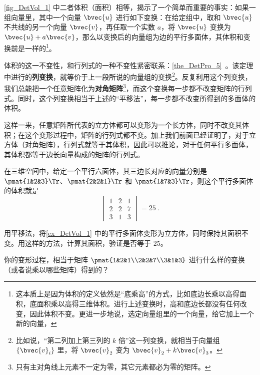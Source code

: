 \autoref{fig_DetVol_1} 中二者体积（面积）相等，揭示了一个简单而重要的事实：如果一组向量里，其中一个向量 $\bvec{u}$ 进行如下变换：在给定组中，取和 $\bvec{u}$ 不共线的另一个向量 $\bvec{v}$，再任取一个实数 $a$，将 $\bvec{u}$ 变换为 $\bvec{u}+a\bvec{v}$，那么以变换后的向量组为边的平行多面体，其体积和变换前是一样的\footnote{这本质上是因为体积的定义依然是“底乘高”的方式，比如底边长乘以高得面积，底面积乘以高得三维体积。进行上述变换时，高和底边长都没有任何改变，因此体积不变。更进一步地说，选定向量组里的一个向量，给它加上一个新的向量，}。

体积的这一不变性，和行列式的一种不变性紧密联系：\autoref{the_DetPro_5}~。该定理中进行的\textbf{列变换}，就等价于上一段所说的向量组的变换\footnote{比如说，“第二列加上第三列的 $k$ 倍”这一列变换，就相当于向量组 $\{\bvec{v}_i\}$ 里，将 $\bvec{v}_2$ 变为 $\bvec{v}_2+k\bvec{v}_3$。}。反复利用这个列变换，我们总能把一个任意矩阵化为\textbf{对角矩阵}\footnote{只有主对角线上元素不一定为零，其它元素都必为零的矩阵。}，而这个变换每一步都不改变矩阵的行列式。同时，这个列变换相当于上述的“平移法”，每一步都不改变所得到的多面体的体积。

这样一来，任意矩阵所代表的立方体都可以变形为一个长方体，同时不改变其体积；在这个变形过程中，矩阵的行列式都不变。加上我们前面已经证明了，对于立方体（对角矩阵），行列式就等于其体积，因此可以推论，对于任何平行多面体，其体积都等于边长向量构成的矩阵的行列式。

\begin{example}{}\label{ex_DetVol_1}
在三维空间中，给定一个平行六面体，其三边长对应的向量分别是 $\pmat{1&2&3}\Tr$、$\pmat{2&2&1}\Tr$ 和 $\pmat{1&7&3}\Tr$，则这个平行多面体的体积就是
\begin{equation}
\begin{vmatrix}
1&2&1\\
2&2&7\\
3&1&3
\end{vmatrix} = 25~.
\end{equation}
\end{example}

\begin{exercise}{}
用平移法，将\autoref{ex_DetVol_1} 中的平行多面体变形为立方体，同时保持其面积不变。用这样的方法，计算其面积，验证是否等于 $25$。

你的变形过程，相当于矩阵 $\pmat{1&2&1\\2&2&7\\3&1&3}$ 进行什么样的变换（或者说乘以哪些矩阵）得到的？
\end{exercise}


